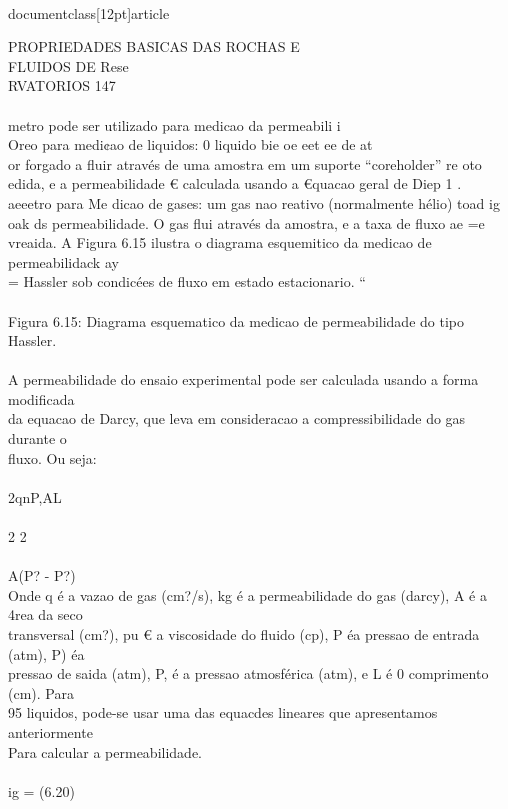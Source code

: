 \\documentclass[12pt]{article}
\begin{document}
PROPRIEDADES BASICAS DAS ROCHAS E\\
FLUIDOS DE Rese\\
RVATORIOS 147\\
\\
metro pode ser utilizado para medicao da permeabili i\\
Oreo para medi¢ao de liquidos: 0 liquido bie oe eet ee de at\\
or forgado a fluir através de uma amostra em um suporte “coreholder” re oto\\
edida, e a permeabilidade € calculada usando a €quacao geral de Diep 1 .\\
aeeetro para Me dicao de gases: um gas nao reativo (normalmente hélio) toad ig\\
oak ds permeabilidade. O gas flui através da amostra, e a taxa de fluxo ae =e\\
vreaida. A Figura 6.15 ilustra o diagrama esquemitico da medicao de permeabilidack ay\\
= Hassler sob condicées de fluxo em estado estacionario. “\\
\\
Figura 6.15: Diagrama esquematico da medicao de permeabilidade do tipo Hassler.\\
\\
A permeabilidade do ensaio experimental pode ser calculada usando a forma modificada\\
da equacao de Darcy, que leva em consideracao a compressibilidade do gas durante o\\
fluxo. Ou seja:\\
\\
2qnP,AL\\
\\
2 2\\
\\
A(P? - P?)\\
Onde q é a vazao de gas (cm?/s), kg é a permeabilidade do gas (darcy), A é a 4rea da seco\\
transversal (cm?), pu € a viscosidade do fluido (cp), P éa pressao de entrada (atm), P) éa\\
pressao de saida (atm), P, é a pressao atmosférica (atm), e L é 0 comprimento (cm). Para\\
95 liquidos, pode-se usar uma das equacdes lineares que apresentamos anteriormente\\
Para calcular a permeabilidade.\\
\\
ig = (6.20)\\
\end{document}
